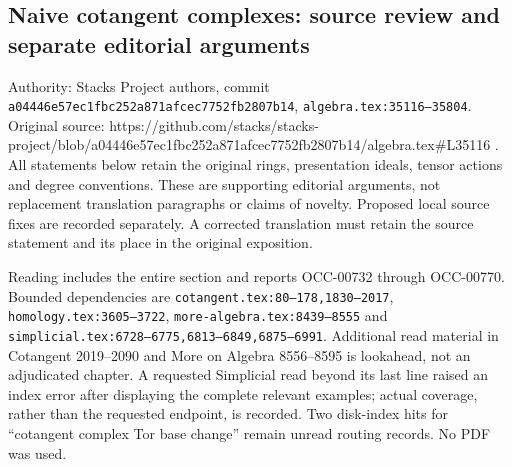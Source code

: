 \subsection{Naive cotangent complexes: source review and separate editorial arguments}\label{algebra-proof-044-naive-cotangent-complexes-source-review-and-separate-editorial-arguments}

Authority: Stacks Project authors, commit \texttt{a044\allowbreak{}46e5\allowbreak{}7ec1\allowbreak{}fbc2\allowbreak{}52a8\allowbreak{}71af\allowbreak{}cec7\allowbreak{}752f\allowbreak{}b280\allowbreak{}7b14}, \texttt{algebra.\AlgebraIdentifierBreak{}tex:\AlgebraIdentifierBreak{}35116–\AlgebraIdentifierBreak{}35804}. Original source: https:\allowbreak{}/\allowbreak{}/\allowbreak{}github.\allowbreak{}com/\allowbreak{}stacks/\allowbreak{}stacks-\allowbreak{}project/\allowbreak{}blob/\allowbreak{}a04446e57ec1\allowbreak{}fbc252a871af\allowbreak{}cec7752fb280\allowbreak{}7b14/\allowbreak{}algebra.\allowbreak{}tex\#\allowbreak{}L35116 . All statements below retain the original rings, presentation ideals, tensor actions and degree conventions. These are supporting editorial arguments, not replacement translation paragraphs or claims of novelty. Proposed local source fixes are recorded separately. A corrected translation must retain the source statement and its place in the original exposition.

Reading includes the entire section and reports OCC-00732 through OCC-00770. Bounded dependencies are \texttt{cotangent.\AlgebraIdentifierBreak{}tex:\AlgebraIdentifierBreak{}80–\AlgebraIdentifierBreak{}178,\AlgebraIdentifierBreak{}1830–\AlgebraIdentifierBreak{}2017}, \texttt{homology.\AlgebraIdentifierBreak{}tex:\AlgebraIdentifierBreak{}3605–\AlgebraIdentifierBreak{}3722}, \texttt{more-\AlgebraIdentifierBreak{}algebra.\AlgebraIdentifierBreak{}tex:\AlgebraIdentifierBreak{}8439–\AlgebraIdentifierBreak{}8555} and \texttt{simplicial.\AlgebraIdentifierBreak{}tex:\AlgebraIdentifierBreak{}6728–\AlgebraIdentifierBreak{}6775,\AlgebraIdentifierBreak{}6813–\AlgebraIdentifierBreak{}6849,\AlgebraIdentifierBreak{}6875–\AlgebraIdentifierBreak{}6991}. Additional read material in Cotangent 2019--2090 and More on Algebra 8556--8595 is lookahead, not an adjudicated chapter. A requested Simplicial read beyond its last line raised an index error after displaying the complete relevant examples; actual coverage, rather than the requested endpoint, is recorded. Two disk-index hits for ``cotangent complex Tor base change'' remain unread routing records. No PDF was used.

